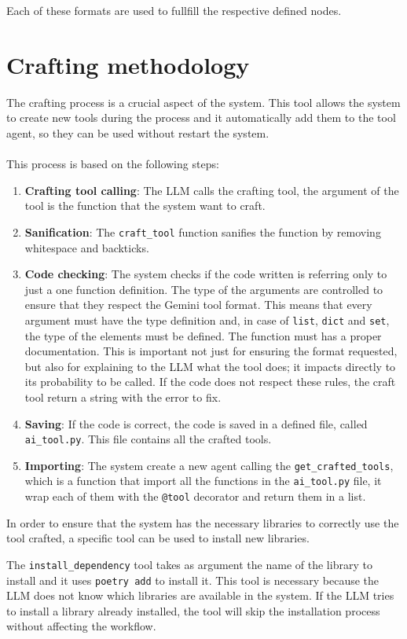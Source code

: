 \documentclass[12pt,a4paper,openright,twoside]{book}
\begin{document}
Each of these formats are used to fullfill the respective defined nodes.
\section{Crafting methodology}
The crafting process is a crucial aspect of the system. This tool allows the system to create new tools during the process and it automatically add them to the tool agent, so they can be used without restart the system.
\\\\
This process is based on the following steps:
\begin{enumerate}
    \item \textbf{Crafting tool calling}: The LLM calls the crafting tool, the argument of the tool is the function that the system want to craft.
    \item \textbf{Sanification}: The \texttt{craft\_tool} function sanifies the function by removing whitespace and backticks. 
    \item \textbf{Code checking}: The system checks if the code written is referring only to just a one function definition. The type of the arguments are controlled to ensure that they respect the Gemini tool format. This means that every argument must have the type definition and, in case of \texttt{list}, \texttt{dict} and \texttt{set}, the type of the elements must be defined. The function must has a proper documentation. This is important not just for ensuring the format requested, but also for explaining to the \ac{LLM} what the tool does; it impacts directly to its probability to be called. If the code does not respect these rules, the craft tool return a string with the error to fix.
    \item \textbf{Saving}: If the code is correct, the code is saved in a defined file, called \texttt{ai\_tool.py}. This file contains all the crafted tools.
    \item \textbf{Importing}: The system create a new agent calling the \texttt{get\_crafted\_tools{}}, which is a function that import all the functions in the \texttt{ai\_tool.py} file, it wrap each of them with the \texttt{@tool} decorator and return them in a list.
\end{enumerate}

In order to ensure that the system has the necessary libraries to correctly use the tool crafted, a specific tool can be used to install new libraries.

The \texttt{install\_dependency} tool takes as argument the name of the library to install and it uses \texttt{poetry add} to install it. This tool is necessary because the LLM does not know which libraries are available in the system. 
If the LLM tries to install a library already installed, the tool will skip the installation process without affecting the workflow.
\end{document}
